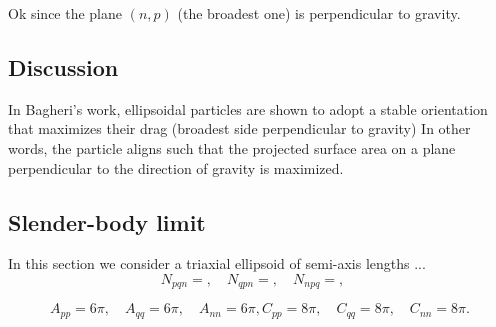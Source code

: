 \documentclass[12pt]{My_preprint}
\begin{document}
Ok since the plane $(n,p)$ (the broadest one) is perpendicular to gravity.



\subsection{Discussion}
In Bagheri's work, ellipsoidal particles are shown to adopt a stable orientation that maximizes their drag (broadest side perpendicular to gravity)
In other words, the particle aligns such that the projected surface area on a plane perpendicular to the direction of gravity is maximized.


\subsection{Slender-body limit}

In this section we consider a triaxial ellipsoid of semi-axis lengths ...
$$
N_{pqn} = , \quad
N_{qpn} = , \quad
N_{npq} = , \quad $$

$$
A_{pp} = 6\pi, \quad A_{qq} = 6\pi,  \quad A_{nn} = 6\pi ,
C_{pp} = 8\pi, \quad C_{qq} = 8\pi,  \quad C_{nn} = 8\pi .
$$






\appendix
\end{document}
